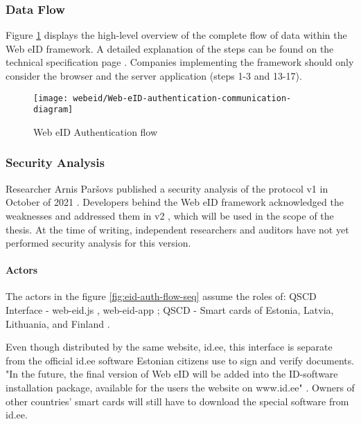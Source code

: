\subsubsection{Data Flow}

Figure \ref{fig:web-eid-authentication} displays the high-level overview of the complete flow of data within the Web eID framework. A detailed explanation of the steps can be found on the technical specification page \cite{ria-webeid-systemarchitecture}. Companies implementing the framework should only consider the browser and the server application (steps 1-3 and 13-17).

\begin{figure}
  \centering
  \texttt{[image: webeid/Web-eID-authentication-communication-diagram]}
  \caption{Web eID Authentication flow \cite{ria-webeid-systemarchitecture}}
  \label{fig:web-eid-authentication}
\end{figure}


\subsubsection{Security Analysis}

Researcher Arnis Paršovs published a security analysis of the protocol v1 in October of 2021 \cite{arnis-report-webeid}. Developers behind the Web eID framework acknowledged the weaknesses and addressed them in v2 \cite{ria-webeid-systemarchitecture}, which will be used in the scope of the thesis. At the time of writing, independent researchers and auditors have not yet performed security analysis for this version.

\paragraph{Actors}

The actors in the figure \ref{fig:eid-auth-flow-seq} assume the roles of: QSCD Interface - web-eid.js \cite{ria-webeid-source-web-eid-js}, web-eid-app \cite{ria-webeid-source-web-eid-app}; QSCD - Smart cards of Estonia, Latvia, Lithuania, and Finland \cite{ria-webeid}.

Even though distributed by the same website, id.ee, this interface is separate from the official id.ee software Estonian citizens use to sign and verify documents. "In the future, the final version of Web eID will be added into the ID-software installation package, available for the users the website on www.id.ee" \cite{ria-webeid}. Owners of other countries' smart cards will still have to download the special software from id.ee.

